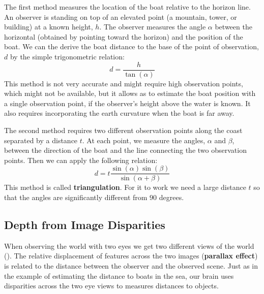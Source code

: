 The first method measures the location of the boat relative to the horizon line. An observer is standing on top of an elevated point (a mountain, tower, or building) at a known height, $h$. The observer measures the angle $\alpha$ between the horizontal (obtained by pointing toward the horizon) and the position of the boat. We can the derive the boat distance to the base of the point of observation, $d$ by the simple trigonometric relation:
\begin{equation}
    d = \frac{h}{\tan (\alpha)}
\end{equation}
This method is not very accurate and might require high observation points, which might not be available, but it allows as to estimate the boat position with a single observation point, if the observer's height above the water is known. It also requires incorporating the earth curvature when the boat is far away.

The second method requires two different observation points along the coast separated by a distance $t$. At each point, we measure the angles, $\alpha$ and $\beta$, between the direction of the boat and the line connecting the two observation points. Then we can apply the following relation:
\begin{equation}
    d = t \frac{\sin (\alpha) \sin (\beta)}{\sin (\alpha+\beta)}
\end{equation}
This method is called {\bf triangulation}. For it to work we need a large distance $t$ so that the angles are significantly different from $90$ degrees.


\subsection{Depth from Image Disparities}

When observing the world with two eyes we get two different views of the world (\fig{\ref{fig:titanic}}). The relative displacement of features across the two images ({\bf parallax effect})
is related to the distance between the observer and the observed scene. Just as in the example of estimating the distance to boats in the sea, our brain uses disparities across the two eye views to measures distances to objects. 


